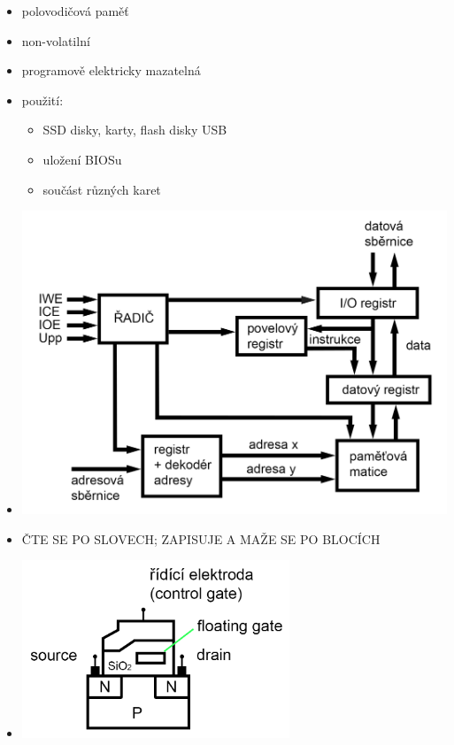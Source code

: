 \documentclass[a4paper,12pt]{article}
\providecommand{\tightlist}{%
\setlength{\itemsep}{0pt}\setlength{\parskip}{0pt}}
\begin{document}
\begin{itemize}
  \tightlist
  \item polovodičová paměť
  \item non-volatilní
  \item programově elektricky mazatelná
  \item použití:
  \begin{itemize}
    \tightlist
    \item SSD disky, karty, flash disky USB
    \item uložení BIOSu
    \item součást různých karet
  \end{itemize}
  \item[] \includegraphics[width=15cm]{ref/blokove-schema-flash-pameti.png}
  \item {\large ČTE SE PO SLOVECH; ZAPISUJE A MAŽE SE PO BLOCÍCH}
  \item[]
  \begin{minipage}[b]{0.4\textwidth}
    \includegraphics[width=8cm]{ref/flash-tranzistor.png}
  \end{minipage}%
  \begin{minipage}[b]{0.6\textwidth}

\end{minipage}
\end{itemize}
\end{document}
